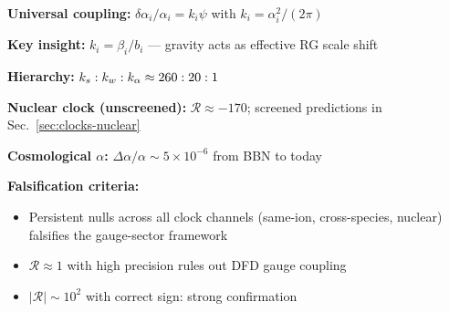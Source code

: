 \begin{tcolorbox}[colback=blue!5!white, colframe=blue!50!black, title=Summary: Gauge Coupling Variation]
\textbf{Universal coupling:} $\delta\alpha_i/\alpha_i = k_i\psi$ with $k_i = \alpha_i^2/(2\pi)$

\textbf{Key insight:} $k_i = \beta_i/b_i$ --- gravity acts as effective RG scale shift

\textbf{Hierarchy:} $k_s : k_w : k_\alpha \approx 260 : 20 : 1$

\textbf{Nuclear clock (unscreened):} $\mathcal{R} \approx -170$; screened predictions in Sec.~\ref{sec:clocks-nuclear}

\textbf{Cosmological $\alpha$:} $\Delta\alpha/\alpha \sim 5 \times 10^{-6}$ from BBN to today

\textbf{Falsification criteria:}
\begin{itemize}
\item Persistent nulls across all clock channels (same-ion, cross-species, nuclear) falsifies the gauge-sector framework
\item $\mathcal{R} \approx 1$ with high precision rules out DFD gauge coupling
\item $|\mathcal{R}| \sim 10^2$ with correct sign: strong confirmation
\end{itemize}
\end{tcolorbox}
